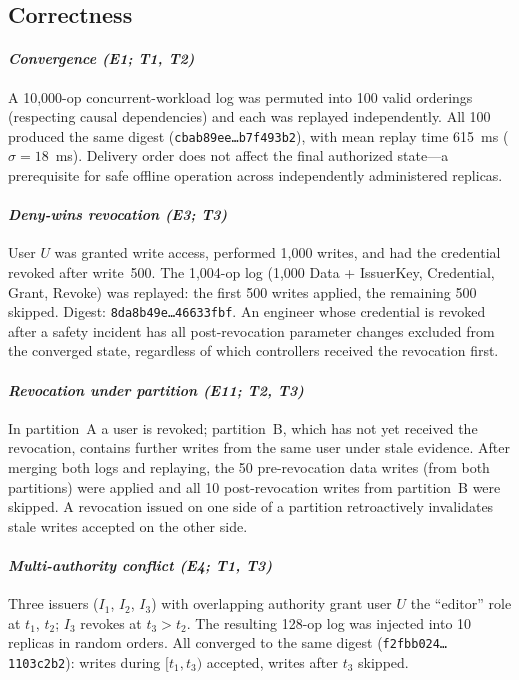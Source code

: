 \documentclass[10pt,journal,compsoc]{IEEEtran}
\begin{document}
\subsection{Correctness}\label{subsec:correctness}

\paragraph*{\textit{Convergence (E1; T1, T2)}}
A 10{,}000-op concurrent-workload log was permuted into 100 valid orderings (respecting causal dependencies) and each was replayed independently. All 100 produced the same digest (\texttt{\small cbab89ee\ldots b7f493b2}), with mean replay time 615~ms ($\sigma=18$~ms). Delivery order does not affect the final authorized state---a prerequisite for safe offline operation across independently administered replicas.

\paragraph*{\textit{Deny-wins revocation (E3; T3)}}
User $U$ was granted write access, performed 1{,}000 writes, and had the credential revoked after write~500. The 1{,}004-op log (1{,}000 Data + IssuerKey, Credential, Grant, Revoke) was replayed: the first 500 writes applied, the remaining 500 skipped. Digest: \texttt{\small 8da8b49e\ldots 46633fbf}. An engineer whose credential is revoked after a safety incident has all post-revocation parameter changes excluded from the converged state, regardless of which controllers received the revocation first.

\paragraph*{\textit{Revocation under partition (E11; T2, T3)}}
In partition~A a user is revoked; partition~B, which has not yet received the revocation, contains further writes from the same user under stale evidence. After merging both logs and replaying, the 50 pre-revocation data writes (from both partitions) were applied and all 10 post-revocation writes from partition~B were skipped. A revocation issued on one side of a partition retroactively invalidates stale writes accepted on the other side.

\paragraph*{\textit{Multi-authority conflict (E4; T1, T3)}}
Three issuers ($I_1$, $I_2$, $I_3$) with overlapping authority grant user $U$ the ``editor'' role at $t_1$, $t_2$; $I_3$ revokes at $t_3>t_2$. The resulting 128-op log was injected into 10 replicas in random orders. All converged to the same digest (\texttt{\small f2fbb024\ldots 1103c2b2}): writes during $[t_1,t_3)$ accepted, writes after $t_3$ skipped.
\end{document}
